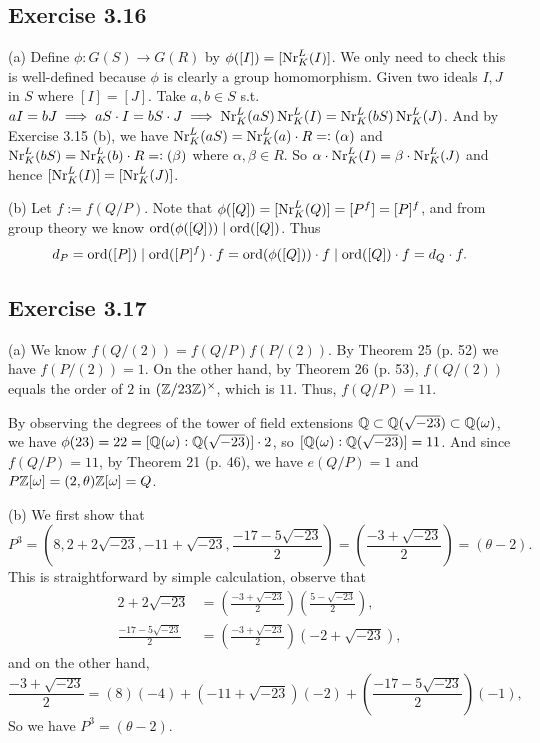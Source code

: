 \documentclass[../Marcus.tex]{subfiles}
\begin{document}
\subsection*{Exercise 3.16}

(a) Define $\phi:G(S)\to G(R)$ by $\phi([I])=[\operatorname{Nr}^L_K(I)]$. We only need to check this is well-defined because $\phi$ is clearly a group homomorphism. Given two ideals $I,J$ in $S$ where $[I]=[J]$. Take $a,b\in S$ s.t. $aI=bJ\implies aS\cdot I=bS\cdot J\implies \operatorname{Nr}^L_K(aS)\operatorname{Nr}^L_K(I)=\operatorname{Nr}^L_K(bS)\operatorname{Nr}^L_K(J)$. And by Exercise 3.15 (b), we have $\operatorname{Nr}^L_K(aS)=\operatorname{Nr}^L_K(a)\cdot R=:(\alpha)$ and $\operatorname{Nr}^L_K(bS)=\operatorname{Nr}^L_K(b)\cdot R=:(\beta)$ where $\alpha,\beta\in R$. So $\alpha\cdot\operatorname{Nr}^L_K(I)=\beta\cdot\operatorname{Nr}^L_K(J)$ and hence $[\operatorname{Nr}^L_K(I)]=[\operatorname{Nr}^L_K(J)]$.

(b) Let $f:=f(Q/P)$. Note that $\phi([Q])=[\operatorname{Nr}^L_K(Q)]=[P^f]=[P]^f$, and from group theory we know $\operatorname{ord}(\phi([Q]))\mid \operatorname{ord}([Q])$. Thus
$$
d_P=\operatorname{ord}([P])\mid \operatorname{ord}([P]^f)\cdot f = \operatorname{ord}(\phi([Q]))\cdot f\mid \operatorname{ord}([Q])\cdot f=d_Q\cdot f.
$$

\subsection*{Exercise 3.17}

(a) We know $f(Q/(2))=f(Q/P)f(P/(2))$. By Theorem 25 (p. 52) we have $f(P/(2))=1$. On the other hand, by Theorem 26 (p. 53), $f(Q/(2))$ equals the order of $2$ in $(\mathbb{Z}/23\mathbb{Z})^{\times}$, which is $11$. Thus, $f(Q/P)=11$.

By observing the degrees of the tower of field extensions $\mathbb{Q}\subset \mathbb{Q}(\sqrt{-23})\subset \mathbb{Q}(\omega)$, we have $\phi(23)=22=[\mathbb{Q}(\omega):\mathbb{Q}(\sqrt{-23})]\cdot 2$, so $[\mathbb{Q}(\omega):\mathbb{Q}(\sqrt{-23})]=11$. And since $f(Q/P)=11$, by Theorem 21 (p. 46), we have $e(Q/P)=1$ and $P\mathbb{Z}[\omega]=(2,\theta)\mathbb{Z}[\omega]=Q$.

(b) We first show that 
$$
P^3=\left(8,2+2\sqrt{-23},-11+\sqrt{-23},\frac{-17-5\sqrt{-23}}{2}\right)=\left(\frac{-3+\sqrt{-23}}{2}\right)=(\theta-2).
$$ 
This is straightforward by simple calculation, observe that
\begin{align*}
    2+2\sqrt{-23} &= \left(\frac{-3+\sqrt{-23}}{2}\right)\left(\frac{5-\sqrt{-23}}{2}\right), \\
    \frac{-17-5\sqrt{-23}}{2} &= \left(\frac{-3+\sqrt{-23}}{2}\right)(-2+\sqrt{-23}),
\end{align*}
and on the other hand, 
$$
\frac{-3+\sqrt{-23}}{2}=(8)(-4)+(-11+\sqrt{-23})(-2)+\left(\frac{-17-5\sqrt{-23}}{2}\right)(-1),
$$ 
So we have $P^3=(\theta-2)$.
\end{document}
